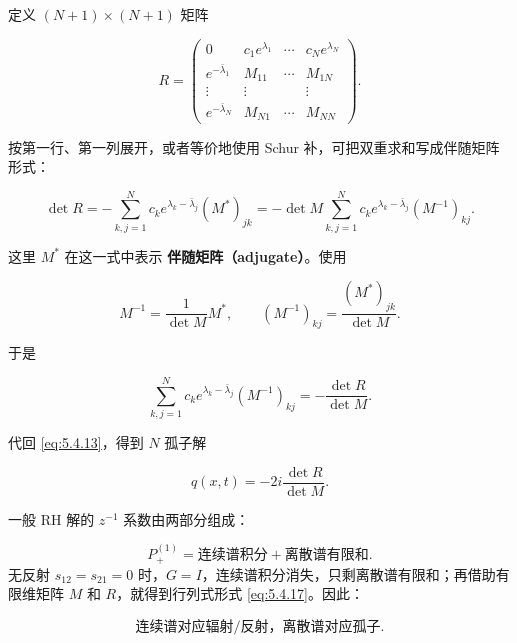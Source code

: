 \documentclass[
    lang=cn,
    scheme=chinese,
    mode=simple,
    device=normal,
    color=blue,
    math=cm,
    thmcnt=section,
    12pt,
    nowatermark
]{elegantbook}
\begin{document}
定义 $(N+1)\times(N+1)$ 矩阵

\begin{equation}
    R=
    \begin{pmatrix}
        0                  & c_1e^{\lambda_1} & \cdots & c_Ne^{\lambda_N} \\
        e^{-\bar\lambda_1} & M_{11}           & \cdots & M_{1N}           \\
        \vdots             & \vdots           &        & \vdots           \\
        e^{-\bar\lambda_N} & M_{N1}           & \cdots & M_{NN}
    \end{pmatrix}.
    \tag{5.4.14}
    \label{eq:5.4.14}
\end{equation}

按第一行、第一列展开，或者等价地使用 Schur 补，可把双重求和写成伴随矩阵形式：

\begin{equation}
    \det R
    =
    -\sum\limits_{k,j=1}^{N}
    c_ke^{\lambda_k-\bar\lambda_j}(M^*)_{jk}
    =
    -\det M
    \sum\limits_{k,j=1}^{N}
    c_ke^{\lambda_k-\bar\lambda_j}(M^{-1})_{kj}.
    \tag{5.4.15}
    \label{eq:5.4.15}
\end{equation}

这里 $M^*$ 在这一式中表示 \textbf{伴随矩阵（adjugate）}。使用

\[
    M^{-1}
    =
    \dfrac{1}{\det M}M^*,
    \qquad
    (M^{-1})_{kj}
    =
    \dfrac{(M^*)_{jk}}{\det M}.
\]

于是

\begin{equation}
    \sum\limits_{k,j=1}^{N}
    c_ke^{\lambda_k-\bar\lambda_j}(M^{-1})_{kj}
    =
    -\dfrac{\det R}{\det M}.
    \tag{5.4.16}
    \label{eq:5.4.16}
\end{equation}

代回 \eqref{eq:5.4.13}，得到 $N$ 孤子解

\begin{equation}
    \boxed{
        q(x,t)
        =
        -2i\dfrac{\det R}{\det M}.
    }
    \tag{5.4.17}
    \label{eq:5.4.17}
\end{equation}

\begin{callout}[4.2 节的核心思路]
    一般 RH 解的 $z^{-1}$ 系数由两部分组成：

    \[
        P_+^{(1)}
        =
        \text{连续谱积分}
        +
        \text{离散谱有限和}.
    \]
    无反射 $s_{12}=s_{21}=0$ 时，$G=I$，连续谱积分消失，只剩离散谱有限和；再借助有限维矩阵 $M$ 和 $R$，就得到行列式形式 \eqref{eq:5.4.17}。因此：

    \[
        \boxed{\text{连续谱对应辐射/反射，离散谱对应孤子}.}
    \]

\end{callout}
\end{document}
